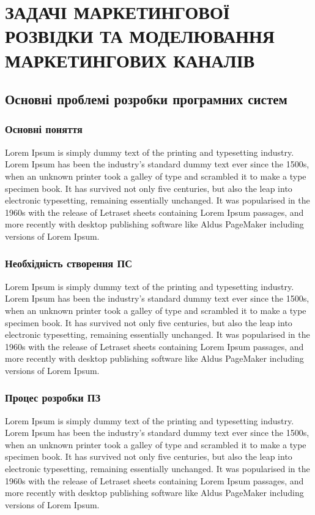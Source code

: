 ﻿\section{ЗАДАЧІ МАРКЕТИНГОВОЇ РОЗВІДКИ ТА МОДЕЛЮВАННЯ МАРКЕТИНГОВИХ КАНАЛІВ}
%
\subsection{Основні проблемі розробки програмних систем}
\subsubsection{Основні поняття}
Lorem Ipsum is simply dummy text of the printing and typesetting industry. Lorem Ipsum has been the industry's standard dummy text ever since the 1500s, when an unknown printer took a galley of type and scrambled it to make a type specimen book. It has survived not only five centuries, but also the leap into electronic typesetting, remaining essentially unchanged. It was popularised in the 1960s with the release of Letraset sheets containing Lorem Ipsum passages, and more recently with desktop publishing software like Aldus PageMaker including versions of Lorem Ipsum.
\subsubsection{Необхідність створення ПС}
Lorem Ipsum is simply dummy text of the printing and typesetting industry. Lorem Ipsum has been the industry's standard dummy text ever since the 1500s, when an unknown printer took a galley of type and scrambled it to make a type specimen book. It has survived not only five centuries, but also the leap into electronic typesetting, remaining essentially unchanged. It was popularised in the 1960s with the release of Letraset sheets containing Lorem Ipsum passages, and more recently with desktop publishing software like Aldus PageMaker including versions of Lorem Ipsum.
\subsubsection{Процес розробки ПЗ}
Lorem Ipsum is simply dummy text of the printing and typesetting industry. Lorem Ipsum has been the industry's standard dummy text ever since the 1500s, when an unknown printer took a galley of type and scrambled it to make a type specimen book. It has survived not only five centuries, but also the leap into electronic typesetting, remaining essentially unchanged. It was popularised in the 1960s with the release of Letraset sheets containing Lorem Ipsum passages, and more recently with desktop publishing software like Aldus PageMaker including versions of Lorem Ipsum.
